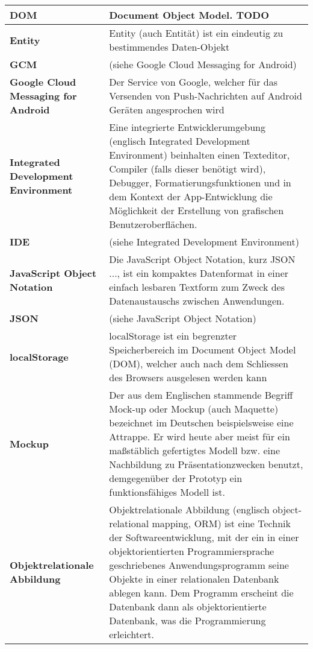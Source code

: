 \begin{longtable}{|m{3cm}|m{11cm}|}
	\textbf{DOM}&
	Document Object Model. TODO \\ \hline

	\textbf{Entity}&
	Entity (auch Entität) ist ein eindeutig zu bestimmendes Daten-Objekt \\ \hline

	\textbf{GCM}&
	(siehe Google Cloud Messaging for Android)\\ \hline

	\textbf{Google Cloud Messaging for Android}&
	Der Service von Google, welcher für das Versenden von Push-Nachrichten auf Android Geräten angesprochen wird\\ \hline

	\textbf{Integrated Development Environment}&
	Eine integrierte Entwicklerumgebung (englisch Integrated Development Environment) beinhalten einen Texteditor, Compiler (falls dieser benötigt wird), Debugger, Formatierungsfunktionen und in dem Kontext der App-Entwicklung die Möglichkeit der Erstellung von grafischen Benutzeroberflächen.\\ \hline

	\textbf{IDE}&
	(siehe Integrated Development Environment)\\ \hline

	\textbf{JavaScript Object Notation}&
	Die JavaScript Object Notation, kurz JSON ..., ist ein kompaktes Datenformat in einer einfach lesbaren Textform zum Zweck des Datenaustauschs zwischen Anwendungen.\cite{wiki_json}\\ \hline

	\textbf{JSON}&
	(siehe JavaScript Object Notation)\\ \hline

	\textbf{localStorage}&
	localStorage ist ein begrenzter Speicherbereich im Document Object Model (DOM), welcher auch nach dem Schliessen des Browsers ausgelesen werden kann\\ \hline	

	\textbf{Mockup}&
	Der aus dem Englischen stammende Begriff Mock-up oder Mockup (auch Maquette) bezeichnet im Deutschen beispielsweise eine Attrappe. Er wird heute aber meist für ein maßstäblich gefertigtes Modell bzw. eine Nachbildung zu Präsentationzwecken benutzt, demgegenüber der Prototyp ein funktionsfähiges Modell ist.\cite{wiki_mockup}\\ \hline

	\textbf{Objektrelationale Abbildung}&
	Objektrelationale Abbildung (englisch object-relational mapping, ORM) ist eine Technik der Softwareentwicklung, mit der ein in einer objektorientierten Programmiersprache geschriebenes Anwendungsprogramm seine Objekte in einer relationalen Datenbank ablegen kann. Dem Programm erscheint die Datenbank dann als objektorientierte Datenbank, was die Programmierung erleichtert. \cite{wiki_orm}\\ \hline	


\end{longtable}
